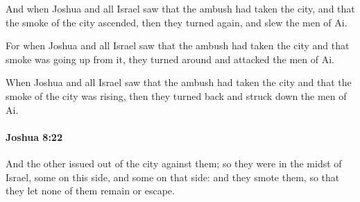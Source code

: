 			\begin{versebox}
					\item[BHS] 
					\item[ASV] And when Joshua and all Israel saw that the ambush had taken the city, and that the smoke of the city ascended, then they turned again, and slew the men of Ai.
					\item[NIV] For when Joshua and all Israel saw that the ambush had taken the city and that smoke was going up from it, they turned around and attacked the men of Ai.
					\item[NRSV] When Joshua and all Israel saw that the ambush had taken the city and that the smoke of the city was rising, then they turned back and struck down the men of Ai.
			\end{versebox}

		\paragraph{Joshua 8:22} %
			\label{JOSHUA-8-22}

			And the other issued out of the city against them; so they were in the midst of Israel, some on this side, and some on that side: and they smote them, so that they let none of them remain or escape.

